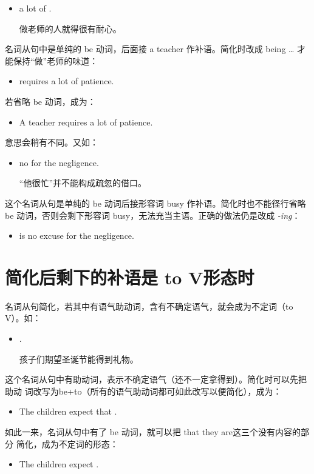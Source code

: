 \begin{itemize}
\item {}  a lot of .

  做老师的人就得很有耐心。
\end{itemize}
名词从句中是单纯的 be 动词，后面接 a teacher 作补语。简化时改成
being \ldots{} 才能保持“做”老师的味道：
\begin{itemize}
\item {} requires a lot of patience.
\end{itemize}
若省略 be 动词，成为：
\begin{itemize}
\item   A teacher requires a lot of patience.
\end{itemize}
意思会稍有不同。又如：
\begin{itemize}
\item {}  no  for the negligence.

  “他很忙”并不能构成疏忽的借口。
\end{itemize}
这个名词从句是单纯的 be 动词后接形容词 busy 作补语。简化时也不能径行省略
be 动词，否则会剩下形容词 busy，无法充当主语。正确的做法仍是改成 \emph{-ing}：
\begin{itemize}
\item {} is no excuse for the negligence.
\end{itemize}

\section{简化后剩下的补语是 to V形态时}

名词从句简化，若其中有语气助动词，含有不确定语气，就会成为不定词（to
V）。如：
\begin{itemize}
\item {}  .

  孩子们期望圣诞节能得到礼物。
\end{itemize}
这个名词从句中有助动词，表示不确定语气（还不一定拿得到）。简化时可以先把助动
词改写为be+to（所有的语气助动词都可如此改写以便简化），成为：
\begin{itemize}
\item The children expect that .
\end{itemize}
如此一来，名词从句中有了 be 动词，就可以把 that they are这三个没有内容的部分
简化，成为不定词的形态：
\begin{itemize}
\item   The children expect .
\end{itemize}

